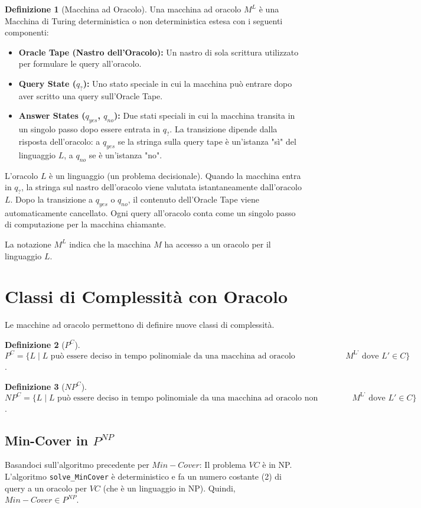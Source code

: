 \documentclass[a4paper]{article}
\theoremstyle{definition} %
\newtheorem{definition}{Definizione}
\begin{document}
\begin{definition}[Macchina ad Oracolo]
Una macchina ad oracolo $M^L$ è una Macchina di Turing deterministica o non deterministica estesa con i seguenti componenti:
\begin{itemize}
    \item \textbf{Oracle Tape (Nastro dell'Oracolo):} Un nastro di sola scrittura utilizzato per formulare le query all'oracolo.
    \item \textbf{Query State ($q_?$):} Uno stato speciale in cui la macchina può entrare dopo aver scritto una query sull'Oracle Tape.
    \item \textbf{Answer States ($q_{yes}$, $q_{no}$):} Due stati speciali in cui la macchina transita in un singolo passo dopo essere entrata in $q_?$. La transizione dipende dalla risposta dell'oracolo: a $q_{yes}$ se la stringa sulla query tape è un'istanza "sì" del linguaggio $L$, a $q_{no}$ se è un'istanza "no".
\end{itemize}
L'oracolo $L$ è un linguaggio (un problema decisionale). Quando la macchina entra in $q_?$, la stringa sul nastro dell'oracolo viene valutata istantaneamente dall'oracolo $L$. Dopo la transizione a $q_{yes}$ o $q_{no}$, il contenuto dell'Oracle Tape viene automaticamente cancellato. Ogni query all'oracolo conta come un singolo passo di computazione per la macchina chiamante.
\end{definition}
La notazione $M^L$ indica che la macchina $M$ ha accesso a un oracolo per il linguaggio $L$.

\section{Classi di Complessità con Oracolo}
Le macchine ad oracolo permettono di definire nuove classi di complessità.
\begin{definition}[$P^C$]
$P^C = \{ L \mid L \text{ può essere deciso in tempo polinomiale da una macchina ad oracolo deterministica } M^{\text{L'}} \text{ dove } L' \in C \}$.
\end{definition}
\begin{definition}[$NP^C$]
$NP^C = \{ L \mid L \text{ può essere deciso in tempo polinomiale da una macchina ad oracolo non deterministica } M^{\text{L'}} \text{ dove } L' \in C \}$.
\end{definition}

\subsection{Min-Cover in $P^{NP}$}
Basandoci sull'algoritmo precedente per $Min-Cover$:
Il problema $VC$ è in NP. L'algoritmo \texttt{solve\_MinCover} è deterministico e fa un numero costante (2) di query a un oracolo per $VC$ (che è un linguaggio in NP).
Quindi, $Min-Cover \in P^{NP}$.
\end{document}
